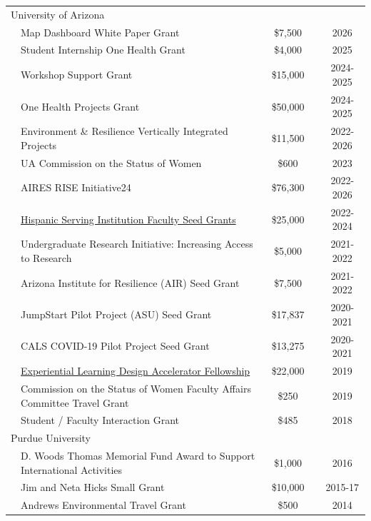 \documentclass[letterpaper]{article}
\begin{document}
\begin{tabular}{llccc}
		
\multicolumn{5}{p{\linewidth}}{\sc University of Arizona} \\

&\multicolumn{1}{l}{Map Dashboard White Paper Grant}	& \$7,500 	& 			& 2026 \\	
        
&\multicolumn{1}{l}{Student Internship One Health Grant}	& \$4,000 	& 			& 2025 \\	
		
&\multicolumn{1}{l}{Workshop Support Grant}	& \$15,000 	& 			& 2024-2025 \\	
		
&\multicolumn{1}{l}{One Health Projects Grant}	& \$50,000 	& 			& 2024-2025 \\	
		
&\multicolumn{1}{l}{Environment \& Resilience Vertically Integrated Projects}	& \$11,500 	& 			& 2022-2026 \\		
	
&\multicolumn{1}{l}{UA Commission on the Status of Women}	& \$600 	& 			& 2023 \\
	
&\multicolumn{1}{l}{AIRES RISE Initiative24}	& \$76,300 	& 			& 2022-2026 \\
&\multicolumn{1}{l}{\href{https://research.arizona.edu/announcing-2022-hsi-seed-grant-awardees}{Hispanic Serving Institution Faculty Seed Grants}}	& \$25,000 	& 			& 2022-2024 \\
&\multicolumn{1}{l}{Undergraduate Research Initiative: Increasing Access to Research}	& \$5,000 	& 			& 2021-2022 \\
&\multicolumn{1}{l}{Arizona Institute for Resilience (AIR) Seed Grant}	& \$7,500 	& 			& 2021-2022 \\
&\multicolumn{1}{l}{JumpStart Pilot Project (ASU) Seed Grant}	& \$17,837 	& 			& 2020-2021 \\
&\multicolumn{1}{l}{CALS COVID-19 Pilot Project Seed Grant}	& \$13,275 	& 			& 2020-2021 \\	
&\multicolumn{1}{l}{\href{https://career.arizona.edu/utilities/experiential-learning-design-accelerator}{Experiential Learning Design Accelerator Fellowship}}	& \$22,000 	& 			& 2019 \\	
&\multicolumn{1}{l}{Commission on the Status of Women Faculty Affairs Committee Travel Grant}	& \$250 	& 			& 2019 \\	
&\multicolumn{1}{l}{Student / Faculty Interaction Grant}	& \$485 	& 			& 2018 \\	

\multicolumn{5}{p{\linewidth}}{\sc Purdue University} \\
&\multicolumn{1}{l}{D. Woods Thomas Memorial Fund Award to Support International Activities}	& \$1,000	& 			& 2016 \\	
&\multicolumn{1}{l}{Jim and Neta Hicks Small Grant}	& \$10,000	& 			& 2015-17 \\	
&\multicolumn{1}{l}{Andrews Environmental Travel Grant}	& \$500	& 			& 2014 \\

\end{tabular}
\end{document}
